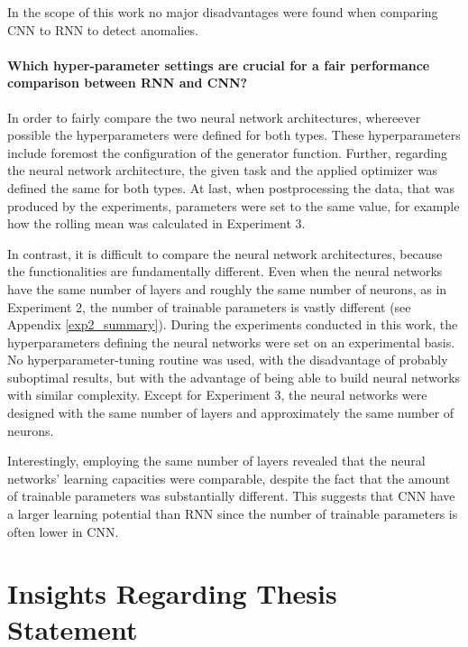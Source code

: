 In the scope of this work no major disadvantages were found when comparing CNN to RNN to detect anomalies.


\paragraph{Which hyper-parameter settings are crucial for a fair performance comparison between RNN and CNN?} \label{settings} In order to fairly compare the two neural network architectures, whereever possible the hyperparameters were defined for both types. These hyperparameters include foremost the configuration of the generator function. Further, regarding the neural network architecture, the given task and the applied optimizer was defined the same for both types. At last, when postprocessing the data, that was produced by the experiments, parameters were set to the same value, for example how the rolling mean was calculated in Experiment 3.

In contrast, it is difficult to compare the neural network architectures, because the functionalities are fundamentally different. Even when the neural networks have the same number of layers and roughly the same number of neurons, as in Experiment 2, the number of trainable parameters is vastly different (see Appendix \ref{exp2_summary}). During the experiments conducted in this work, the hyperparameters defining the neural networks were set on an experimental basis. No hyperparameter-tuning routine was used, with the disadvantage of probably suboptimal results, but with the advantage of being able to build neural networks with similar complexity. Except for Experiment 3, the neural networks were designed with the same number of layers and approximately the same number of neurons.

Interestingly, employing the same number of layers revealed that the neural networks' learning capacities were comparable, despite the fact that the amount of trainable parameters was substantially different. This suggests that CNN have a larger learning potential than RNN since the number of trainable parameters is often lower in CNN. 

\section{Insights Regarding Thesis Statement}

